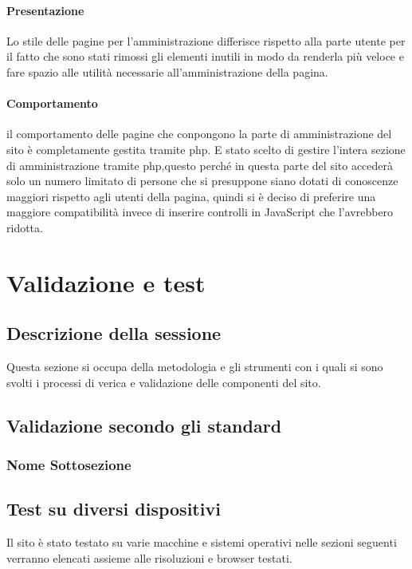 \documentclass[openany, a4paper, 12pt]{report}
\begin{document}
		\subsubsection{Presentazione}
		Lo stile delle pagine per l'amministrazione differisce rispetto alla parte utente per il fatto che sono stati rimossi gli elementi inutili in modo da renderla più veloce e fare spazio alle utilità necessarie all'amministrazione della pagina.
		\subsubsection{Comportamento}
		il comportamento delle pagine che conpongono la parte di amministrazione del sito è completamente gestita tramite php. E stato scelto di gestire l'intera sezione di amministrazione tramite php,questo perché in questa parte del sito accederà solo un numero limitato di persone che si presuppone siano dotati di conoscenze maggiori rispetto agli utenti della pagina, quindi si è deciso di preferire una maggiore compatibilità invece di inserire controlli in JavaScript che l'avrebbero ridotta.
	
	\chapter{Validazione e test}
		\section{Descrizione della sessione}
			Questa sezione si occupa della metodologia e gli strumenti con i quali si sono svolti i processi di verica e validazione delle componenti del sito.
		\section{Validazione secondo gli standard}
			\subsection{Nome Sottosezione}
		\section{Test su diversi dispositivi}
			Il sito è stato testato su varie macchine e sistemi operativi nelle sezioni seguenti verranno elencati assieme alle risoluzioni e browser testati.
\end{document}
